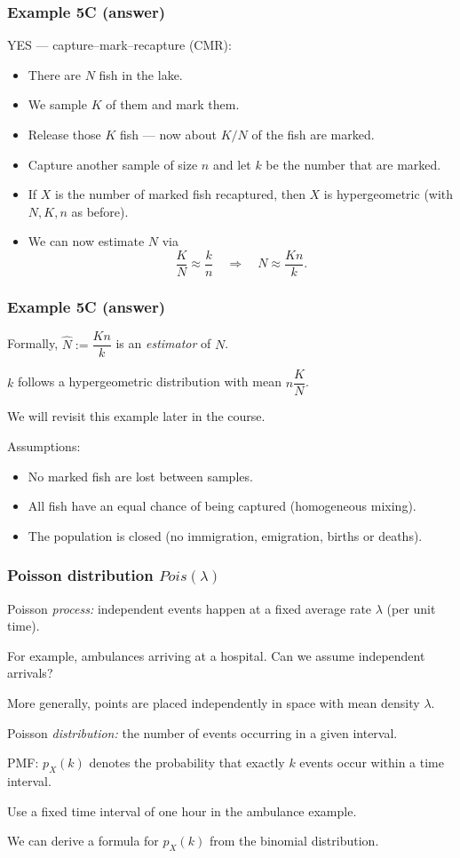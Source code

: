 \documentclass[t,8pt]{beamer}
\begin{document}
\begin{frame}
	\frametitle{Example 5C (answer)}
	YES — capture–mark–recapture (CMR):
	\begin{itemize}
		\item There are $N$ fish in the lake.
		\item We sample $K$ of them and mark them.
		\item Release those $K$ fish — now about $K/N$ of the fish are marked.
		\item Capture another sample of size $n$ and let $k$ be the number that are marked.
		\item If $X$ is the number of marked fish recaptured, then $X$ is hypergeometric (with $N,K,n$ as before).
		\item We can now estimate $N$ via
		\[
		\frac{K}{N}\approx\frac{k}{n}
		\quad\Rightarrow\quad
		N\approx\frac{Kn}{k}.
		\]
	\end{itemize}
\end{frame}

\begin{frame}
	\frametitle{Example 5C (answer)}
	Formally, $\hat N:=\dfrac{Kn}{k}$ is an {\it estimator} of $N$. \par
	$k$ follows a hypergeometric distribution with mean $n\dfrac{K}{N}$. \par
	We will revisit this example later in the course. \par
	Assumptions:
	\begin{itemize}
		\item No marked fish are lost between samples.
		\item All fish have an equal chance of being captured (homogeneous mixing).
		\item The population is closed (no immigration, emigration, births or deaths).
	\end{itemize}
\end{frame}


\begin{frame}
	\frametitle{Poisson distribution $Pois(\lambda)$}
	Poisson {\it process:} independent events happen at a fixed average rate $\lambda$ (per unit time). \par
	{\small\color{NavyBlue}
		For example, ambulances arriving at a hospital. Can we assume independent arrivals?
	} \par
	More generally, points are placed independently in space with mean density $\lambda$. \par
	Poisson {\it distribution:} the number of events occurring in a given interval. \par
	PMF: $p_X(k)$ denotes the probability that exactly $k$ events occur within a time interval. \par
	{\small\color{NavyBlue}
		Use a fixed time interval of one hour in the ambulance example.
	} \par
	We can derive a formula for $p_X(k)$ from the binomial distribution.
\end{frame}
\end{document}

